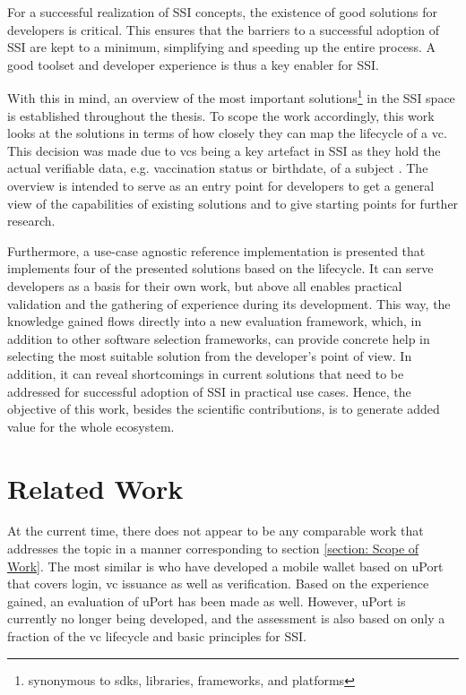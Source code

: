 	For a successful realization of \ac{SSI} concepts, the existence of good solutions for developers is critical. This ensures that the barriers to a successful adoption of \ac{SSI} are kept to a minimum, simplifying and speeding up the entire process. A good toolset and developer experience is thus a key enabler for \ac{SSI}.
	
	With this in mind, an overview of the most important solutions\footnote{synonymous to \acp{sdk}, libraries, frameworks, and platforms} in the \ac{SSI} space is established throughout the thesis. To scope the work accordingly, this work looks at the solutions in terms of how closely they can map the lifecycle of a \acf{vc}. This decision was made due to \acsp{vc} being a key artefact in \ac{SSI} as they hold the actual verifiable data, e.g. vaccination status or birthdate, of a subject \cite{sporny_verifiable_2019}. The overview is intended to serve as an entry point for developers to get a general view of the capabilities of existing solutions and to give starting points for further research. 
	
	Furthermore, a use-case agnostic reference implementation is presented that implements four of the presented solutions based on the lifecycle. It can serve developers as a basis for their own work, but above all enables practical validation and the gathering of experience during its development. This way, the knowledge gained flows directly into a new evaluation framework, which, in addition to other software selection frameworks, can provide concrete help in selecting the most suitable solution from the developer's point of view. In addition, it can reveal shortcomings in current solutions that need to be addressed for successful adoption of \ac{SSI} in practical use cases. Hence, the objective of this work, besides the scientific contributions, is to generate added value for the whole ecosystem.
	
	\section{Related Work} %
	
	At the current time, there does not appear to be any comparable work that addresses the topic in a manner corresponding to section \ref{section: Scope of Work}. The most similar is \cite{naik_uport_2020} who have developed a mobile wallet based on uPort that covers login, \ac{vc} issuance as well as verification. Based on the experience gained, an evaluation of uPort has been made as well. However, uPort is currently no longer being developed, and the assessment is also based on only a fraction of the \acs{vc} lifecycle and basic principles for \ac{SSI}.
	
